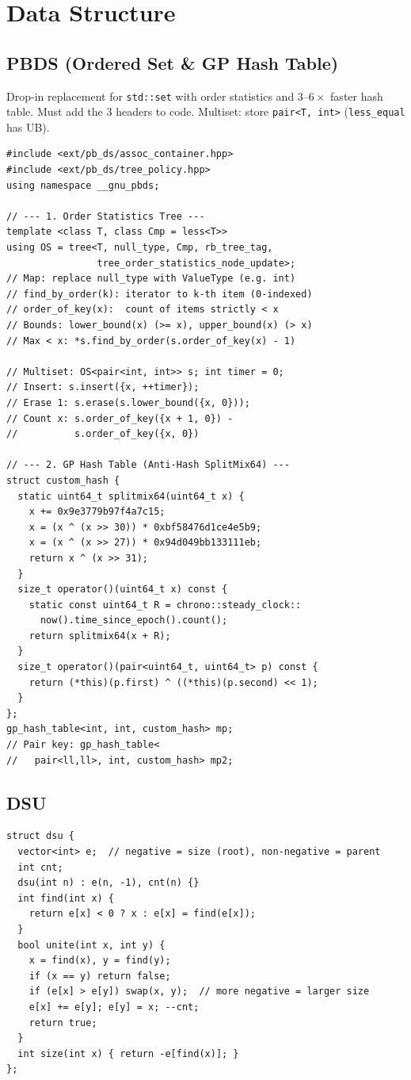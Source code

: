 \section{Data Structure}
\subsection[PBDS (Tree \& GP Hash)]{PBDS (Ordered Set \& GP Hash Table)}
Drop-in replacement for \texttt{std::set} with order statistics and $3$--$6\times$ faster hash table. Must add the 3 headers to code. Multiset: store \texttt{pair<T, int>} (\texttt{less\_equal} has UB).
\begin{verbatim}
#include <ext/pb_ds/assoc_container.hpp>
#include <ext/pb_ds/tree_policy.hpp>
using namespace __gnu_pbds;

// --- 1. Order Statistics Tree ---
template <class T, class Cmp = less<T>>
using OS = tree<T, null_type, Cmp, rb_tree_tag,
                tree_order_statistics_node_update>;
// Map: replace null_type with ValueType (e.g. int)
// find_by_order(k): iterator to k-th item (0-indexed)
// order_of_key(x):  count of items strictly < x
// Bounds: lower_bound(x) (>= x), upper_bound(x) (> x)
// Max < x: *s.find_by_order(s.order_of_key(x) - 1)

// Multiset: OS<pair<int, int>> s; int timer = 0;
// Insert: s.insert({x, ++timer});
// Erase 1: s.erase(s.lower_bound({x, 0}));
// Count x: s.order_of_key({x + 1, 0}) -
//          s.order_of_key({x, 0})

// --- 2. GP Hash Table (Anti-Hash SplitMix64) ---
struct custom_hash {
  static uint64_t splitmix64(uint64_t x) {
    x += 0x9e3779b97f4a7c15;
    x = (x ^ (x >> 30)) * 0xbf58476d1ce4e5b9;
    x = (x ^ (x >> 27)) * 0x94d049bb133111eb;
    return x ^ (x >> 31);
  }
  size_t operator()(uint64_t x) const {
    static const uint64_t R = chrono::steady_clock::
      now().time_since_epoch().count();
    return splitmix64(x + R);
  }
  size_t operator()(pair<uint64_t, uint64_t> p) const {
    return (*this)(p.first) ^ ((*this)(p.second) << 1);
  }
};
gp_hash_table<int, int, custom_hash> mp;
// Pair key: gp_hash_table<
//   pair<ll,ll>, int, custom_hash> mp2;
\end{verbatim}

\subsection{DSU}
\begin{verbatim}
struct dsu {
  vector<int> e;  // negative = size (root), non-negative = parent
  int cnt;
  dsu(int n) : e(n, -1), cnt(n) {}
  int find(int x) {
    return e[x] < 0 ? x : e[x] = find(e[x]);
  }
  bool unite(int x, int y) {
    x = find(x), y = find(y);
    if (x == y) return false;
    if (e[x] > e[y]) swap(x, y);  // more negative = larger size
    e[x] += e[y]; e[y] = x; --cnt;
    return true;
  }
  int size(int x) { return -e[find(x)]; }
};
\end{verbatim}
